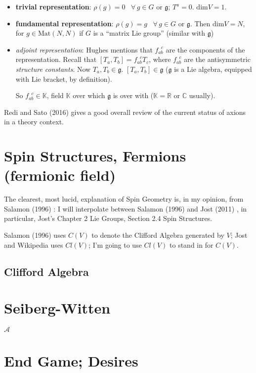 \documentclass[10pt]{amsart}
\begin{document}
\begin{multicols}{2}
\begin{itemize}
  \item \textbf{trivial representation}: $\rho(g) =0$ \, $\forall \, g\in G$ or $\mathfrak{g}$; $T^a =0$.  $\text{dim}V=1$.  \item \textbf{fundamental representation}: $\rho(g) =g$ \, $\forall \, g\in G$ or $\mathfrak{g}$.  Then $\text{dim}V=N$,  for $g\in \text{Mat}(N,N)$ if $G$ is a ``matrix Lie group'' (similar with $\mathfrak{g}$)   
\item \emph{adjoint representation}: Hughes mentions that $f_{ab}^{ \; \; c}$ are the components of the representation.  Recall that $[T_a,T_b] = f_{ab}^{ \; \; c} T_c$, where $f_{ab}^{ \; \; c}$ are the antisymmetric \emph{structure constants}.  Now $T_a, T_b\in \mathfrak{g}$.  $[T_a,T_b]\in \mathfrak{g}$ ($\mathfrak{g}$ is a Lie algebra, equipped with Lie bracket, by definition).  

So $f_{ab}^{ \; \; c} \in \mathbb{K}$, field $\mathbb{K}$ over which $\mathfrak{g}$ is over with ($\mathbb{K} = \mathbb{R}$ or $\mathbb{C}$ usually).  


\end{itemize}




Redi and Sato (2016) \cite{RS1602} gives a good overall review of the current status of axions in a theory context.



\section{Spin Structures, Fermions (fermionic field) }

The clearest, most lucid, explanation of Spin Geometry is, in my opinion, from Salamon (1996) \cite{Sala1996}: I will interpolate between Salamon (1996) and Jost (2011) \cite{JJost2011}, in particular, Jost's Chapter 2 Lie Groups, Section 2.4 Spin Structures.  

Salamon (1996) \cite{Sala1996} uses $C(V)$ to denote the Clifford Algebra generated by $V$; Jost and Wikipedia uses $Cl(V)$; I'm going to use $Cl(V)$ to stand in for $C(V)$.  

\subsection{Clifford Algebra}


\section{Seiberg-Witten}

$\mathcal{A}$

\section{End Game; Desires}








\end{multicols}
\end{document}
